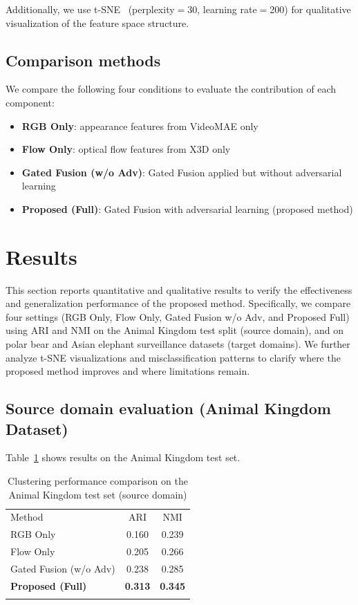 \documentclass[twocolumn]{svjour3}
\begin{document}
Additionally, we use t-SNE~\cite{van2008visualizing} (perplexity$=$30, learning rate$=$200) for qualitative visualization of the feature space structure.

\subsection{Comparison methods}

We compare the following four conditions to evaluate the contribution of each component:
\begin{itemize}
  \item \textbf{RGB Only}: appearance features from VideoMAE only
  \item \textbf{Flow Only}: optical flow features from X3D only
  \item \textbf{Gated Fusion (w/o Adv)}: Gated Fusion applied but without adversarial learning
  \item \textbf{Proposed (Full)}: Gated Fusion with adversarial learning (proposed method)
\end{itemize}

\section{Results}
\label{sec:results}

This section reports quantitative and qualitative results to verify the effectiveness and generalization performance of the proposed method.
Specifically, we compare four settings (RGB Only, Flow Only, Gated Fusion w/o Adv, and Proposed Full) using ARI and NMI on the Animal Kingdom test split (source domain), and on polar bear and Asian elephant surveillance datasets (target domains).
We further analyze t-SNE visualizations and misclassification patterns to clarify where the proposed method improves and where limitations remain.

\subsection{Source domain evaluation (Animal Kingdom Dataset)}

Table~\ref{tab:results_ak} shows results on the Animal Kingdom test set.

\begin{table}[t]
  \caption{Clustering performance comparison on the Animal Kingdom test set (source domain)}
  \label{tab:results_ak}
  \begin{tabular}{lcc}
    \hline\noalign{\smallskip}
    Method & ARI & NMI \\
    \noalign{\smallskip}\hline\noalign{\smallskip}
    RGB Only & 0.160 & 0.239 \\
    Flow Only & 0.205 & 0.266 \\
    Gated Fusion (w/o Adv) & 0.238 & 0.285 \\
    \textbf{Proposed (Full)} & \textbf{0.313} & \textbf{0.345} \\
    \noalign{\smallskip}\hline
  \end{tabular}
\end{table}
\end{document}
